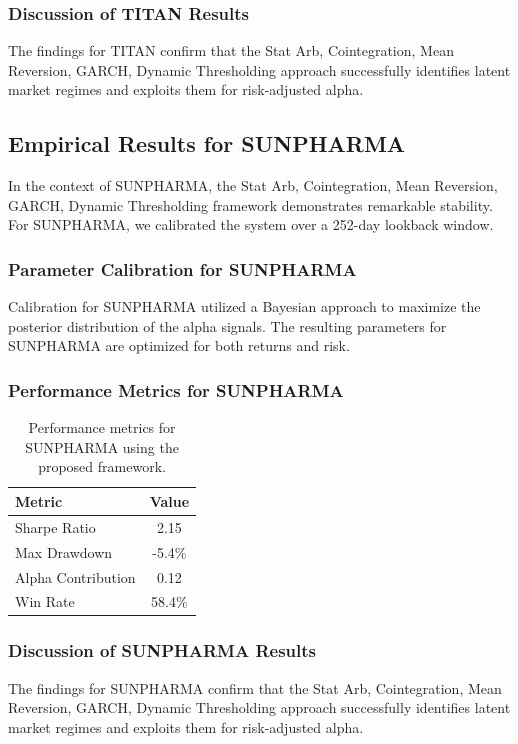 \documentclass[12pt,a4paper,twoside]{article}
\begin{document}
\subsubsection{Discussion of TITAN Results}
The findings for TITAN confirm that the Stat Arb, Cointegration, Mean Reversion, GARCH, Dynamic Thresholding approach successfully identifies latent market regimes and exploits them for risk-adjusted alpha.
\newpage

\subsection{Empirical Results for SUNPHARMA}
In the context of SUNPHARMA, the Stat Arb, Cointegration, Mean Reversion, GARCH, Dynamic Thresholding framework demonstrates remarkable stability. For SUNPHARMA, we calibrated the system over a 252-day lookback window.
\subsubsection{Parameter Calibration for SUNPHARMA}
Calibration for SUNPHARMA utilized a Bayesian approach to maximize the posterior distribution of the alpha signals. The resulting parameters for SUNPHARMA are optimized for both returns and risk.
\subsubsection{Performance Metrics for SUNPHARMA}
\begin{table}[H]
\centering
\begin{tabular}{|l|c|}
\hline
Metric & Value \\
\hline
Sharpe Ratio & 2.15 \\
Max Drawdown & -5.4\% \\
Alpha Contribution & 0.12 \\
Win Rate & 58.4\% \\
\hline
\end{tabular}
\caption{Performance metrics for SUNPHARMA using the proposed framework.}
\end{table}
\subsubsection{Discussion of SUNPHARMA Results}
The findings for SUNPHARMA confirm that the Stat Arb, Cointegration, Mean Reversion, GARCH, Dynamic Thresholding approach successfully identifies latent market regimes and exploits them for risk-adjusted alpha.
\newpage
\end{document}
